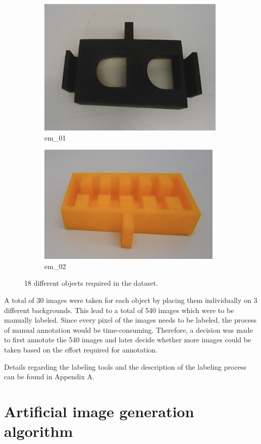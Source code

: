 \begin{figure}
		\begin{subfigure}{.3\textwidth}
  			\centering
  			\includegraphics[width=.5\linewidth]{images/em_01}
  			\caption{em\_01}
  			\label{fig:em_01}
		\end{subfigure}
		\begin{subfigure}{.3\textwidth}
  			\centering
  			\includegraphics[width=.5\linewidth]{images/em_02}
  			\caption{em\_02}
  			\label{fig:em_02}
		\end{subfigure}
		\caption{18 different objects required in the dataset.}
		\label{Fig:objects}
	\end{figure}

A total of 30 images were taken for each object by placing them individually on 3 different backgrounds. This lead to a total of 540 images which were to be manually labeled. Since every pixel of the images needs to be labeled, the process of manual annotation would be time-consuming. Therefore, a decision was made to first annotate the 540 images and later decide whether more images could be taken based on the effort required for annotation.

Details regarding the labeling tools and the description of the labeling process can be found in Appendix A. 

\section{Artificial image generation algorithm}

